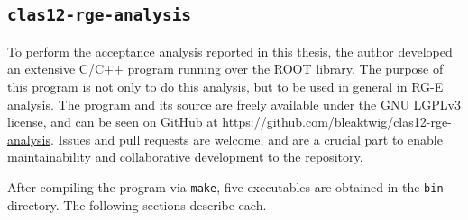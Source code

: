 \subsection{\texttt{clas12-rge-analysis}}
\label{ssec::clas12_rge_analysis}
    To perform the acceptance analysis reported in this thesis, the author developed an extensive C/C++ program running over the ROOT library.
    The purpose of this program is not only to do this analysis, but to be used in general in RG-E analysis.
    The program and its source are freely available under the GNU LGPLv3 license, and can be seen on GitHub at \hyperlink{https://github.com/bleaktwig/clas12-rge-analysis}{https://github.com/bleaktwig/clas12-rge-analysis}.
    Issues and pull requests are welcome, and are a crucial part to enable maintainability and collaborative development to the repository.

    After compiling the program via \texttt{make}, five executables are obtained in the \texttt{bin} directory.
    The following sections describe each.

    
    
    
    
    
